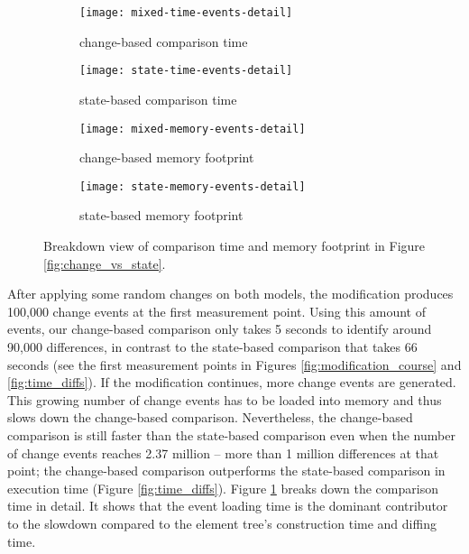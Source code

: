 \begin{figure}[ht]
    \centering
    \begin{subfigure}[t]{0.495\linewidth}
        \texttt{[image: mixed-time-events-detail]}
        \caption{change-based comparison time}
        \label{fig:time_changediff_detail}
    \end{subfigure}
    \hfill
    \begin{subfigure}[t]{0.495\linewidth}
        \texttt{[image: state-time-events-detail]}
        \caption{state-based comparison time}
        \label{fig:time_statediff_detail}
    \end{subfigure}
    \begin{subfigure}[t]{0.495\linewidth}
        \texttt{[image: mixed-memory-events-detail]}
        \caption{change-based memory footprint}
        \label{fig:memory_changediff_detail}
    \end{subfigure}
    \hfill
    \begin{subfigure}[t]{0.495\linewidth}
        \texttt{[image: state-memory-events-detail]}
        \caption{state-based memory footprint}
        \label{fig:memory_statediff_detail}
    \end{subfigure}
    \caption{Breakdown view of comparison time and memory footprint in Figure \ref{fig:change_vs_state}.}
    \label{fig:time_memory_detail}
\end{figure}

After applying some random changes on both models, the modification produces 100,000 change events at the first measurement point. Using this amount of events, our change-based comparison only takes 5 seconds to identify around 90,000 differences, in contrast to the state-based comparison that takes 66 seconds (see the first measurement points in Figures \ref{fig:modification_course} and \ref{fig:time_diffs}). If the modification continues, more change events are generated. This growing number of change events has to be loaded into memory and thus slows down the change-based comparison. Nevertheless, the change-based comparison is still faster than the state-based comparison even when the number of change events reaches 2.37 million -- more than 1 million differences at that point; the change-based comparison outperforms the state-based comparison in execution time (Figure \ref{fig:time_diffs}). Figure \ref{fig:time_changediff_detail} breaks down the comparison time in detail. It shows that the event loading time is the dominant contributor to the slowdown compared to the element tree's construction time and diffing time. 

